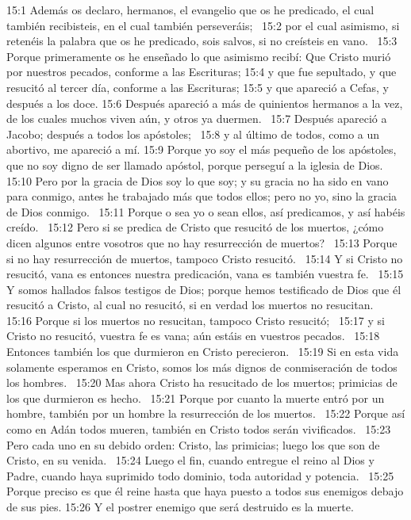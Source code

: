 15:1 Además os declaro, hermanos, el evangelio que os he predicado, el cual también recibisteis, en el cual también perseveráis;  
15:2 por el cual asimismo, si retenéis la palabra que os he predicado, sois salvos, si no creísteis en vano.  
15:3 Porque primeramente os he enseñado lo que asimismo recibí: Que Cristo murió por nuestros pecados, conforme a las Escrituras; 
15:4 y que fue sepultado, y que resucitó al tercer día, conforme a las Escrituras; 
15:5 y que apareció a Cefas, y después a los doce. 
15:6 Después apareció a más de quinientos hermanos a la vez, de los cuales muchos viven aún, y otros ya duermen.  
15:7 Después apareció a Jacobo; después a todos los apóstoles;  
15:8 y al último de todos, como a un abortivo, me apareció a mí. 
15:9 Porque yo soy el más pequeño de los apóstoles, que no soy digno de ser llamado apóstol, porque perseguí a la iglesia de Dios. 
15:10 Pero por la gracia de Dios soy lo que soy; y su gracia no ha sido en vano para conmigo, antes he trabajado más que todos ellos; pero no yo, sino la gracia de Dios conmigo.  
15:11 Porque o sea yo o sean ellos, así predicamos, y así habéis creído.  
15:12 Pero si se predica de Cristo que resucitó de los muertos, ¿cómo dicen algunos entre vosotros que no hay resurrección de muertos?  
15:13 Porque si no hay resurrección de muertos, tampoco Cristo resucitó.  
15:14 Y si Cristo no resucitó, vana es entonces nuestra predicación, vana es también vuestra fe.  
15:15 Y somos hallados falsos testigos de Dios; porque hemos testificado de Dios que él resucitó a Cristo, al cual no resucitó, si en verdad los muertos no resucitan.  
15:16 Porque si los muertos no resucitan, tampoco Cristo resucitó;  
15:17 y si Cristo no resucitó, vuestra fe es vana; aún estáis en vuestros pecados.  
15:18 Entonces también los que durmieron en Cristo perecieron.  
15:19 Si en esta vida solamente esperamos en Cristo, somos los más dignos de conmiseración de todos los hombres.  
15:20 Mas ahora Cristo ha resucitado de los muertos; primicias de los que durmieron es hecho.  
15:21 Porque por cuanto la muerte entró por un hombre, también por un hombre la resurrección de los muertos.  
15:22 Porque así como en Adán todos mueren, también en Cristo todos serán vivificados.  
15:23 Pero cada uno en su debido orden: Cristo, las primicias; luego los que son de Cristo, en su venida.  
15:24 Luego el fin, cuando entregue el reino al Dios y Padre, cuando haya suprimido todo dominio, toda autoridad y potencia.  
15:25 Porque preciso es que él reine hasta que haya puesto a todos sus enemigos debajo de sus pies. 
15:26 Y el postrer enemigo que será destruido es la muerte.  

